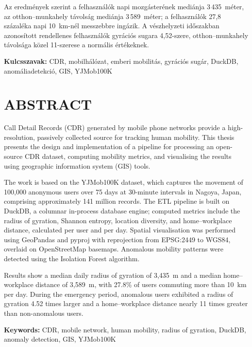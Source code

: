 Az eredmények szerint a felhasználók napi mozgásterének mediánja 3\,435~méter, az otthon–munkahely távolság mediánja 3\,589~méter; a felhasználók 27,8 százaléka napi 10~km-nél messzebbre ingázik. A vészhelyzeti időszakban azonosított rendellenes felhasználók gyrációs sugara 4,52-szere, otthon–munkahely távolsága közel 11-szerese a normális értékeknek.

\vspace{0.5em}
\noindent\textbf{Kulcsszavak:} CDR, mobilhálózat, emberi mobilitás, gyrációs sugár, DuckDB, anomáliadetekció, GIS, YJMob100K

\newpage
\section*{ABSTRACT}

Call Detail Records (CDR) generated by mobile phone networks provide a high-resolution, passively collected source for tracking human mobility. This thesis presents the design and implementation of a pipeline for processing an open-source CDR dataset, computing mobility metrics, and visualising the results using geographic information system (GIS) tools.

The work is based on the YJMob100K dataset, which captures the movement of 100,000 anonymous users over 75 days at 30-minute intervals in Nagoya, Japan, comprising approximately 141 million records. The ETL pipeline is built on DuckDB, a columnar in-process database engine; computed metrics include the radius of gyration, Shannon entropy, location diversity, and home–workplace distance, calculated per user and per day. Spatial visualisation was performed using GeoPandas and pyproj with reprojection from EPSG:2449 to WGS84, overlaid on OpenStreetMap basemaps. Anomalous mobility patterns were detected using the Isolation Forest algorithm.

Results show a median daily radius of gyration of 3,435~m and a median home–workplace distance of 3,589~m, with 27.8\% of users commuting more than 10~km per day. During the emergency period, anomalous users exhibited a radius of gyration 4.52 times larger and a home–workplace distance nearly 11 times greater than non-anomalous users.

\vspace{0.5em}
\noindent\textbf{Keywords:} CDR, mobile network, human mobility, radius of gyration, DuckDB, anomaly detection, GIS, YJMob100K



\newpage
{}
\tableofcontents
\newpage


